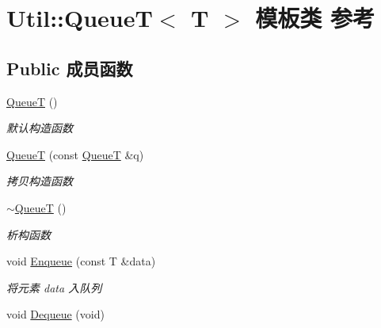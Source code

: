\hypertarget{class_util_1_1_queue_t}{\section{Util\-:\-:Queue\-T$<$ T $>$ 模板类 参考}
\label{class_util_1_1_queue_t}
}
\subsection*{Public 成员函数}
\begin{DoxyCompactItemize}
\item 
\hypertarget{class_util_1_1_queue_t_a7f7dd7b295f6c8c32bcb14e7ab8370c3}{\hyperlink{class_util_1_1_queue_t_a7f7dd7b295f6c8c32bcb14e7ab8370c3}{Queue\-T} ()}\label{class_util_1_1_queue_t_a7f7dd7b295f6c8c32bcb14e7ab8370c3}

\begin{DoxyCompactList}\small\item\em 默认构造函数 \end{DoxyCompactList}\item 
\hypertarget{class_util_1_1_queue_t_a60ba7fd4b5b60e073e1c51a37dec811a}{\hyperlink{class_util_1_1_queue_t_a60ba7fd4b5b60e073e1c51a37dec811a}{Queue\-T} (const \hyperlink{class_util_1_1_queue_t}{Queue\-T} \&q)}\label{class_util_1_1_queue_t_a60ba7fd4b5b60e073e1c51a37dec811a}

\begin{DoxyCompactList}\small\item\em 拷贝构造函数 \end{DoxyCompactList}\item 
\hypertarget{class_util_1_1_queue_t_a87d170c71234c2076e219f49173b8f10}{\hyperlink{class_util_1_1_queue_t_a87d170c71234c2076e219f49173b8f10}{$\sim$\-Queue\-T} ()}\label{class_util_1_1_queue_t_a87d170c71234c2076e219f49173b8f10}

\begin{DoxyCompactList}\small\item\em 析构函数 \end{DoxyCompactList}\item 
void \hyperlink{class_util_1_1_queue_t_a77641ed829b14f0700d547ca1f4ee5ee}{Enqueue} (const T \&data)
\begin{DoxyCompactList}\small\item\em 将元素 data 入队列 \end{DoxyCompactList}\item 
\hypertarget{class_util_1_1_queue_t_a92cabe296935e24b22e9264a53d05892}{void \hyperlink{class_util_1_1_queue_t_a92cabe296935e24b22e9264a53d05892}{Dequeue} (void)}\label{class_util_1_1_queue_t_a92cabe296935e24b22e9264a53d05892}


\end{DoxyCompactItemize}
